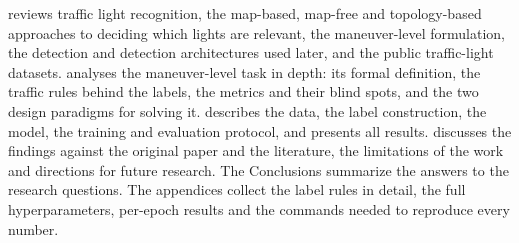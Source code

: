  reviews traffic light recognition, the map-based, map-free and topology-based
approaches to deciding which lights are relevant, the maneuver-level formulation, the detection and
detection architectures used later, and the public traffic-light datasets.  analyses the maneuver-level task in depth: its formal definition,
the traffic rules behind the labels, the metrics and their blind spots, and the two design paradigms
for solving it.  describes the data, the label construction, the model, the training
and evaluation protocol, and presents all results.  discusses the findings against
the original paper and the literature, the limitations of the work and directions for future research.
The Conclusions summarize the answers to the research questions. The appendices collect the label
rules in detail, the full hyperparameters, per-epoch results and the commands needed to reproduce every
number.
